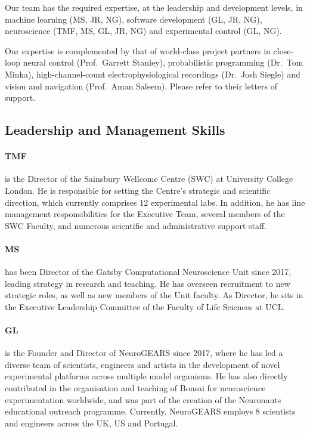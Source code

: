 Our team has the required expertise, at the leadership and development levels,
in machine learning (MS, JR, NG), software development (GL, JR, NG), neuroscience
(TMF, MS, GL, JR, NG) and experimental control (GL, NG).

Our expertise is complemented by that of world-class project partners in
close-loop neural control (Prof.~Garrett Stanley), probabilistic programming
(Dr.~Tom Minka), high-channel-count electrophysiological recordings (Dr.~Josh
Siegle) and vision and navigation (Prof.~Aman Saleem).  Please refer to their
letters of support.

\subsection{Leadership and Management Skills}

\paragraph{TMF} is the Director of the Sainsbury Wellcome Centre (SWC) at
University College London. He is responsible for setting the Centre’s strategic
and scientific direction, which currently comprises 12 experimental labs. In
addition, he has line management responsibilities for the Executive Team,
several members of the SWC Faculty, and numerous scientific and administrative
support staff.

\paragraph{MS} has been Director of the Gatsby Computational
Neuroscience Unit since 2017, leading strategy in research and teaching. He has overseen
recruitment to new strategic roles, as well as new members of the Unit faculty.
As Director, he sits in the Executive
Leadership Committee of the Faculty of Life Sciences at UCL.

\paragraph{GL} is the Founder and Director of NeuroGEARS since 2017, where he
has led a diverse team of scientists, engineers and artists in the development
of novel experimental platforms across multiple model organisms. He has also
directly contributed in the organisation and teaching of Bonsai for
neuroscience experimentation worldwide, and was part of the creation of the
Neuronauts educational outreach programme. Currently, NeuroGEARS employs 8
scientists and engineers across the UK, US and Portugal.

